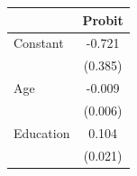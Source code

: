 \begin{tabular}{lc}
\toprule
 & Probit \\
\midrule
Constant & -0.721 \\
 & (0.385) \\
Age & -0.009 \\
 & (0.006) \\
Education & 0.104 \\
 & (0.021) \\
\bottomrule
\end{tabular}
